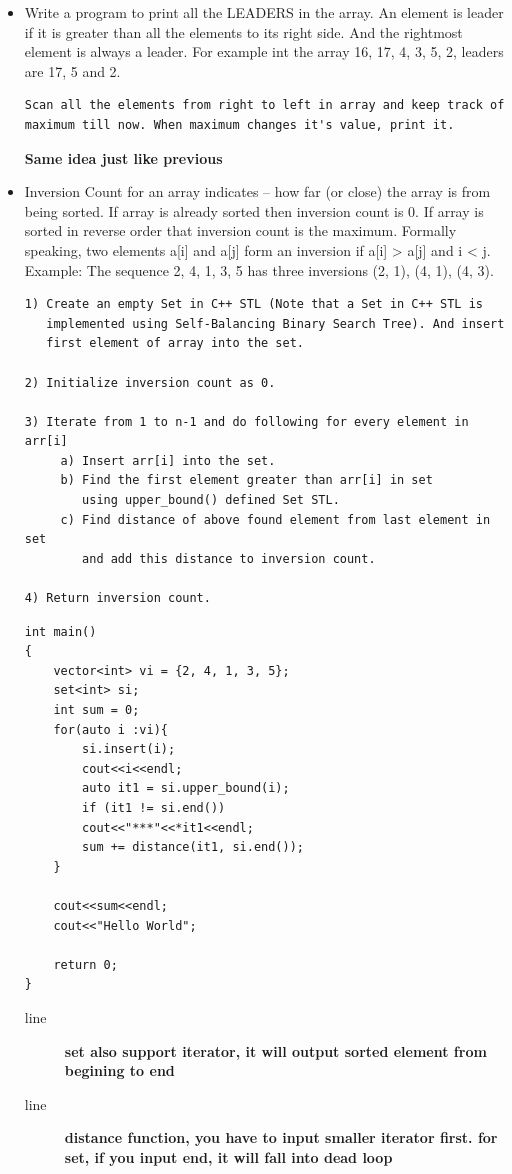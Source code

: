 \documentclass[a4paper,12pt,twoside]{book}
\begin{document}
\begin{itemize}
\item Write a program to print all the LEADERS in the array. An element is leader if it is greater than all the elements to its right side. And the rightmost element is always a leader. For example int the array {16, 17, 4, 3, 5, 2}, leaders are 17, 5 and 2. 
\begin{lstlisting}[breaklines]
Scan all the elements from right to left in array and keep track of maximum till now. When maximum changes it's value, print it.
\end{lstlisting}
\textbf{Same idea just like previous}

\item Inversion Count for an array indicates -- how far (or close) the array is from being sorted. If array is already sorted then inversion count is 0. If array is sorted in reverse order that inversion count is the maximum. Formally speaking, two elements a[i] and a[j] form an inversion if a[i] > a[j] and i < j. Example:
The sequence 2, 4, 1, 3, 5 has three inversions (2, 1), (4, 1), (4, 3).

\begin{lstlisting}[breaklines]
1) Create an empty Set in C++ STL (Note that a Set in C++ STL is 
   implemented using Self-Balancing Binary Search Tree). And insert
   first element of array into the set.

2) Initialize inversion count as 0.

3) Iterate from 1 to n-1 and do following for every element in arr[i]
     a) Insert arr[i] into the set.
     b) Find the first element greater than arr[i] in set
        using upper_bound() defined Set STL.
     c) Find distance of above found element from last element in set
        and add this distance to inversion count.

4) Return inversion count.
\end{lstlisting}

\begin{lstlisting}[breaklines]
int main()
{
	vector<int> vi = {2, 4, 1, 3, 5};
	set<int> si;
	int sum = 0;
	for(auto i :vi){
		si.insert(i);
		cout<<i<<endl;
		auto it1 = si.upper_bound(i);
		if (it1 != si.end())
		cout<<"***"<<*it1<<endl;
		sum += distance(it1, si.end());
	}
	
	cout<<sum<<endl;
	cout<<"Hello World";
	
	return 0;
}
\end{lstlisting}
\begin{description}
	\item[line ] \textbf{set also support iterator, it will output sorted element from begining to end }
	\item[line ] \textbf{distance function, you have to input smaller iterator first. for set, if you input end, it will fall into dead loop}
	

\end{description}
\end{itemize}
\end{document}
